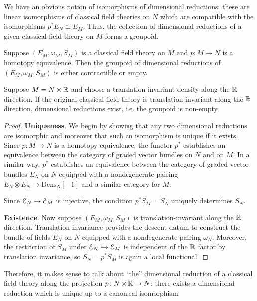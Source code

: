 \documentclass[10pt, oneside]{article}
\newcommand{\Dens}{\mathrm{Dens}}
\begin{document}
We have an obvious notion of isomorphisms of dimensional reductions: these are linear isomorphisms of classical field theories on $N$ which are compatible with the isomorphisms $p^* E_N\cong E_M$. Thus, the collection of dimensional reductions of a given classical field theory on $M$ forms a groupoid.

\begin{prop}
Suppose $(E_M, \omega_M, S_M)$ is a classical field theory on $M$ and $p\colon M\rightarrow N$ is a homotopy equivalence. Then the groupoid of dimensional reductions of $(E_M, \omega_M, S_M)$ is either contractible or empty.

Suppose $M=N\times \mathbb R$ and choose a translation-invariant density along the $\mathbb R$ direction. If the original classical field theory is translation-invariant along the $\mathbb R$ direction, dimensional reductions exist, i.e. the groupoid is non-empty.
\label{prop:dimensionalreductionunique}
\end{prop}
\begin{proof} \textbf{Uniqueness}. We begin by showing that any two dimensional reductions are isomorphic and moreover that such an isomorphism is unique if it exists. Since $p\colon M\rightarrow N$ is a homotopy equivalence, the functor $p^*$ establishes an equivalence between the category of graded vector bundles on $N$ and on $M$. In a similar way, $p^*$ establishes an equivalence between the category of graded vector bundles $E_N$ on $N$ equipped with a nondegenerate pairing $E_N\otimes E_N\rightarrow \Dens_N[-1]$ and a similar category for $M$.

Since $\mathcal E_N\rightarrow \mathcal E_M$ is injective, the condition $p^* S_M = S_N$ uniquely determines $S_N$.

\textbf{Existence}. Now suppose $(E_M, \omega_M, S_M)$ is translation-invariant along the $\mathbb R$ direction. Translation invariance provides the descent datum to construct the bundle of fields $E_N$ on $N$ equipped with a nondegenerate pairing $\omega_N$. Moreover, the restriction of $S_M$ under $\mathcal E_N\hookrightarrow \mathcal E_M$ is independent of the $\mathbb R$ factor by translation invariance, so $S_N=p^* S_M$ is again a local functional.
\end{proof}

\begin{remark}
Therefore, it makes sense to talk about ``the'' dimensional reduction of a classical field theory along the projection $p \colon N \times \mathbb R \to N$: there exists a dimensional reduction which is unique up to a canonical isomorphism.
\end{remark}
\end{document}
